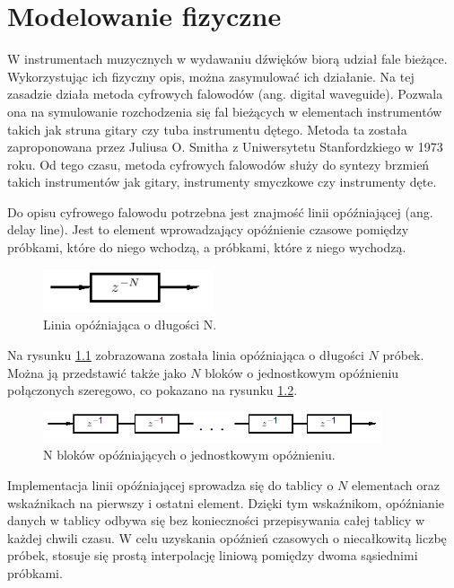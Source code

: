 \chapter{Modelowanie fizyczne}
W instrumentach muzycznych w wydawaniu dźwięków biorą udział fale bieżące. Wykorzystując ich fizyczny opis, można zasymulować ich działanie. Na tej zasadzie działa metoda cyfrowych falowodów (ang. digital waveguide). Pozwala ona na symulowanie  rozchodzenia się fal bieżących w elementach instrumentów takich jak struna gitary czy tuba instrumentu dętego. Metoda ta została zaproponowana przez Juliusa O. Smitha z Uniwersytetu Stanfordzkiego w 1973 roku. Od tego czasu, metoda cyfrowych falowodów służy do syntezy brzmień takich instrumentów jak gitary, instrumenty smyczkowe czy instrumenty dęte.

Do opisu cyfrowego falowodu potrzebna jest znajmość linii opóźniającej (ang. delay line). Jest to element wprowadzający opóźnienie czasowe pomiędzy próbkami, które do niego wchodzą, a próbkami, które z niego wychodzą. 
\begin{figure}[H]
	\centering
	\includegraphics[width=5cm]{grafiki/linia}
	\captionsetup{justification=centering}
	\caption{Linia opóźniająca o długości N.}
	\label{rys:delay_line}
\end{figure}
Na rysunku \ref{rys:delay_line} zobrazowana została linia opóźniająca o długości $N$ próbek. Można ją przedstawić także jako $N$ bloków o jednostkowym opóźnieniu połączonych szeregowo, co pokazano na rysunku \ref{rys:model_delay_line2}.
\begin{figure}[H]
	\centering
	\includegraphics[width=10cm]{grafiki/model_linie}
	\captionsetup{justification=centering}
	\caption{N bloków opóźniających o jednostkowym opóżnieniu.}
	\label{rys:model_delay_line2}
\end{figure}
 Implementacja linii opóźniającej sprowadza się do tablicy o $N$ elementach oraz wskaźnikach na pierwszy i ostatni element. Dzięki tym wskaźnikom, opóźnianie danych w tablicy odbywa się bez konieczności przepisywania całej tablicy w każdej chwili czasu. W celu uzyskania opóźnień czasowych o niecałkowitą liczbę próbek, stosuje się prostą interpolację liniową pomiędzy dwoma sąsiednimi próbkami.

